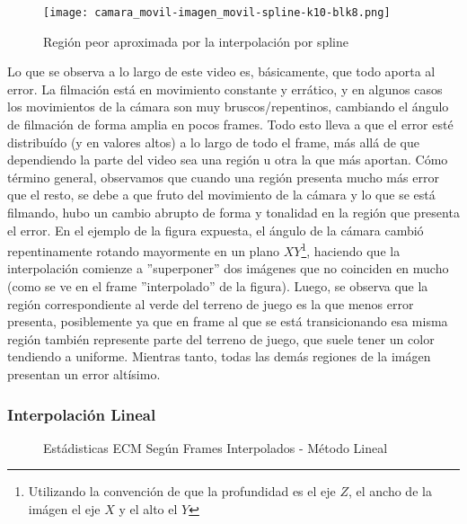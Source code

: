 \begin{figure}[H]
    \centering
    \texttt{[image: camara\_movil-imagen\_movil-spline-k10-blk8.png]}
    \label{fig:movil-movil_spline-heatmap}
    \caption{Regi\'on peor aproximada por la interpolaci\'on por spline}
\end{figure}

\par Lo que se observa a lo largo de este video es, b\'asicamente, que todo
aporta al error. La filmaci\'on est\'a en movimiento constante y err\'atico, y
en algunos casos los movimientos de la c\'amara son muy bruscos/repentinos,
cambiando el \'angulo de filmaci\'on de forma amplia en pocos frames. Todo esto
lleva a que el error est\'e distribu\'ido (y en valores altos) a lo largo de
todo el frame, m\'as all\'a de que dependiendo la parte del video sea una
regi\'on u otra la que m\'as aportan. C\'omo t\'ermino general, observamos que
cuando una regi\'on presenta mucho m\'as error que el resto, se debe a que
fruto del movimiento de la c\'amara y lo que se est\'a filmando, hubo un cambio
abrupto de forma y tonalidad en la regi\'on que presenta el error. En el
ejemplo de la figura expuesta, el \'angulo de la c\'amara cambi\'o
repentinamente rotando mayormente en un plano $XY$\footnote{Utilizando la
convenci\'on de que la profundidad es el eje $Z$, el ancho de la im\'agen el
eje $X$ y el alto el $Y$}, haciendo que la interpolaci\'on comienze a
''superponer'' dos im\'agenes que no coinciden en mucho (como se ve en el frame
''interpolado'' de la figura).  Luego, se observa que la regi\'on
correspondiente al verde del terreno de juego es la que menos error presenta,
posiblemente ya que en frame al que se est\'a transicionando esa misma regi\'on
tambi\'en represente parte del terreno de juego, que suele tener un color
tendiendo a uniforme. Mientras tanto, todas las dem\'as regiones de la im\'agen
presentan un error alt\'isimo.

\subsubsection{Interpolaci\'on Lineal}

\begin{figure}[H]
    \centering
    \caption{Est\'adisticas ECM Seg\'un Frames Interpolados - M\'etodo Lineal}
    \label{fig:movil-movil_lineal-mse_estadisticas}
\end{figure}

